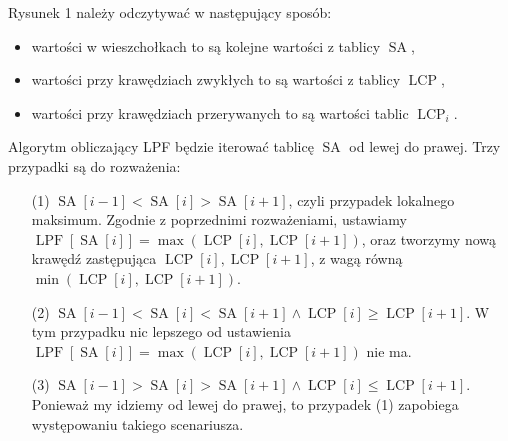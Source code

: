 \documentclass[a4paper,12pt]{article}
\theoremstyle{definition}
\DeclareMathOperator{\SA}{SA}
\DeclareMathOperator{\LCP}{LCP}
\DeclareMathOperator{\LPF}{LPF}
\begin{document}
\pagebreak

Rysunek 1 należy odczytywać w następujący sposób:
\begin{itemize}
\item wartości w wieszchołkach to są kolejne wartości z tablicy $\SA$,
\item wartości przy krawędziach zwykłych to są wartości z tablicy $\LCP$,
\item wartości przy krawędziach przerywanych to są wartości tablic $\LCP_{i}$.
\end{itemize}

Algorytm obliczający LPF będzie iterować tablicę $\SA$ od lewej do prawej.
Trzy przypadki są do rozważenia:

\begin{enumerate}
\item[(1)] $\SA[i - 1] < \SA[i] > \SA[i + 1]$, czyli przypadek lokalnego maksimum.
  Zgodnie z poprzednimi rozważeniami, ustawiamy $\LPF[\SA[i]] = \max(\LCP[i], \LCP[i + 1])$, oraz
  tworzymy nową krawędź zastępująca $\LCP[i], \LCP[i + 1]$, z wagą równą $\min(\LCP[i], \LCP[i + 1])$.
\item[(2)] $\SA[i - 1] < \SA[i] < \SA[i + 1] \land \LCP[i] \geq \LCP[i + 1]$.
  W tym przypadku nic lepszego od ustawienia $\LPF[\SA[i]] = \max(\LCP[i], \LCP[i + 1])$ nie ma.
\item[(3)] $\SA[i - 1] > \SA[i] > \SA[i + 1] \land \LCP[i] \leq \LCP[i + 1]$.
  Ponieważ my idziemy od lewej do prawej, to przypadek (1) zapobiega występowaniu takiego scenariusza.



\end{enumerate}
\end{document}

